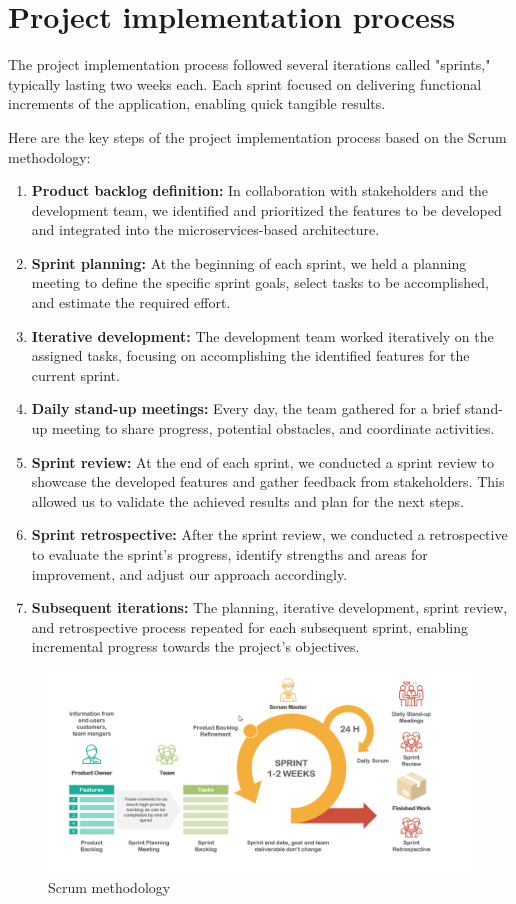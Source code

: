 \section{Project implementation process}

The project implementation process followed several iterations called "sprints," typically lasting two weeks each. Each sprint focused on delivering functional increments of the application, enabling quick tangible results.

Here are the key steps of the project implementation process based on the Scrum methodology:

\begin{enumerate}
\item \textbf{Product backlog definition:} In collaboration with stakeholders and the development team, we identified and prioritized the features to be developed and integrated into the microservices-based architecture.
\item \textbf{Sprint planning:} At the beginning of each sprint, we held a planning meeting to define the specific sprint goals, select tasks to be accomplished, and estimate the required effort.
\item \textbf{Iterative development:} The development team worked iteratively on the assigned tasks, focusing on accomplishing the identified features for the current sprint.
\item \textbf{Daily stand-up meetings:} Every day, the team gathered for a brief stand-up meeting to share progress, potential obstacles, and coordinate activities.
\item \textbf{Sprint review:} At the end of each sprint, we conducted a sprint review to showcase the developed features and gather feedback from stakeholders. This allowed us to validate the achieved results and plan for the next steps.
\item \textbf{Sprint retrospective:} After the sprint review, we conducted a retrospective to evaluate the sprint's progress, identify strengths and areas for improvement, and adjust our approach accordingly.
\item \textbf{Subsequent iterations:} The planning, iterative development, sprint review, and retrospective process repeated for each subsequent sprint, enabling incremental progress towards the project's objectives.
\end{enumerate}

\begin{figure}[H]
\centering
\includegraphics[width=\linewidth]{images/scrum.png}
\caption{Scrum methodology}\label{fig:scrum}
\end{figure}

